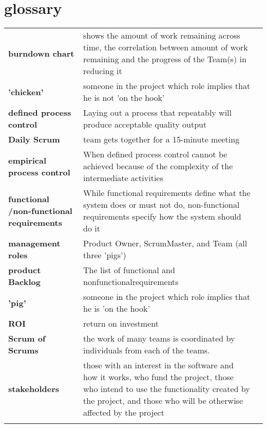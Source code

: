 \section*{glossary}

\begin{table}[H]
  \begin{tabular}{lll}
    \textbf{burndown chart} &  shows the amount of work remaining across time, the correlation between amount of work remaining and the progress of the Team(s) in reducing it\\
    \textbf{'chicken'} &  someone in the project which role implies that he is not 'on the hook'\\
    \textbf{defined process control} &  Laying out a process that repeatably will produce acceptable quality output\\
    \textbf{Daily Scrum} & team gets together for a 15-minute meeting\\
    \textbf{empirical process control} &  When defined process control cannot be achieved because of the complexity of the intermediate activities\\
    \textbf{functional /non-functional requirements} &  While functional requirements define what the system does or must not do, non-functional requirements specify how the system should do it\\
    \textbf{management roles} & Product Owner, ScrumMaster, and Team (all three 'pigs')\\
    \textbf{product Backlog} & The list of functional and nonfunctionalrequirements\\
    \textbf{'pig'} & someone in the project which role implies that he is 'on the hook'\\
    \textbf{ROI} &  return on investment\\
    \textbf{Scrum of Scrums} &  the work of many teams is coordinated by individuals from each of the teams.\\
    \textbf{stakeholders} &  those with an interest in the software and how it works, who fund the project, those who intend to use the functionality created by the project, and those who will be otherwise affected by the project\\
   & 
  \end{tabular}
\end{table}